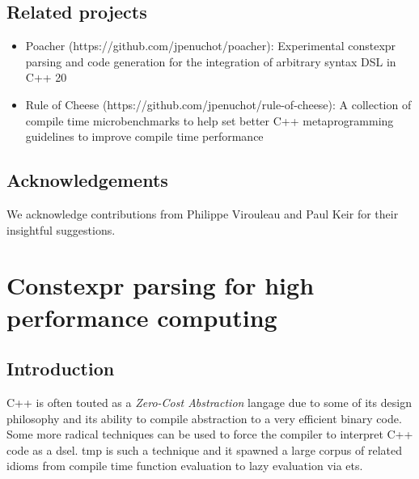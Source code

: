 \documentclass[english,12pt,a4paper]{book}
\providecommand{\cpp}{\textsc{C++}\xspace}
\begin{document}
\section{Related projects} %

\begin{itemize}

\item Poacher (https://github.com/jpenuchot/poacher): Experimental constexpr
      parsing and code generation for the integration of arbitrary syntax DSL in
      \cpp20

\item Rule of Cheese (https://github.com/jpenuchot/rule-of-cheese):
      A collection of compile time microbenchmarks to help set better
      \cpp metaprogramming guidelines to improve compile time performance
\end{itemize}

\section{Acknowledgements}

We acknowledge contributions from Philippe Virouleau and Paul Keir for their
insightful suggestions.

\chapter{
  Constexpr parsing for high performance computing
}

\section{Introduction}

\cpp is often touted as a \textit{Zero-Cost Abstraction} langage due to some of
its design philosophy and its ability to compile abstraction to a very efficient
binary code. Some more radical techniques can be used to force the compiler to
interpret \cpp code as a \gls{dsel}. \Gls{tmp} is such a technique
and it spawned a large corpus of related idioms from compile time function
evaluation to lazy evaluation via \glspl{et}.
\end{document}
